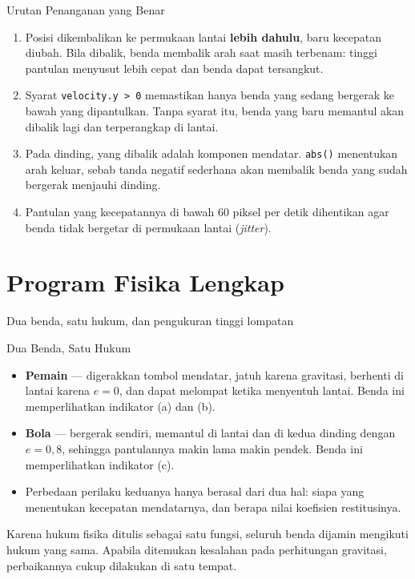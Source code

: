 \documentclass[aspectratio=169,10pt]{beamer}
\begin{document}
\begin{frame}{Urutan Penanganan yang Benar}
\begin{enumerate}
  \item Posisi dikembalikan ke permukaan lantai \textbf{lebih dahulu}, baru
        kecepatan diubah. Bila dibalik, benda membalik arah saat masih terbenam:
        tinggi pantulan menyusut lebih cepat dan benda dapat tersangkut.
  \item Syarat \texttt{velocity.y > 0} memastikan hanya benda yang sedang
        bergerak ke bawah yang dipantulkan. Tanpa syarat itu, benda yang baru
        memantul akan dibalik lagi dan terperangkap di lantai.
  \item Pada dinding, yang dibalik adalah komponen mendatar. \texttt{abs()}
        menentukan arah keluar, sebab tanda negatif sederhana akan membalik
        benda yang sudah bergerak menjauhi dinding.
  \item Pantulan yang kecepatannya di bawah 60 piksel per detik dihentikan agar
        benda tidak bergetar di permukaan lantai (\emph{jitter}).
\end{enumerate}
\end{frame}

\section{Program Fisika Lengkap}
  {Dua benda, satu hukum, dan pengukuran tinggi lompatan}

\begin{frame}{Dua Benda, Satu Hukum}
\begin{itemize}
  \item \textbf{Pemain} --- digerakkan tombol mendatar, jatuh karena
        gravitasi, berhenti di lantai karena $e = 0$, dan dapat melompat ketika
        menyentuh lantai. Benda ini memperlihatkan indikator (a) dan (b).
  \item \textbf{Bola} --- bergerak sendiri, memantul di lantai dan di kedua
        dinding dengan $e = 0{,}8$, sehingga pantulannya makin lama makin
        pendek. Benda ini memperlihatkan indikator (c).
  \item Perbedaan perilaku keduanya hanya berasal dari dua hal: siapa yang
        menentukan kecepatan mendatarnya, dan berapa nilai koefisien
        restitusinya.
\end{itemize}
\begin{kotak}
Karena hukum fisika ditulis sebagai satu fungsi, seluruh benda dijamin
mengikuti hukum yang sama. Apabila ditemukan kesalahan pada perhitungan
gravitasi, perbaikannya cukup dilakukan di satu tempat.
\end{kotak}
\end{frame}
\end{document}
